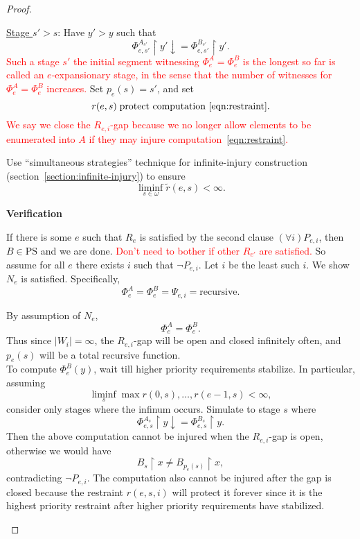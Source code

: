 \documentclass{article}
\newcommand{\COMMENT}[1]{\textcolor{red}{#1}}
\begin{document}
\begin{proof}
\begin{tcolorbox}
      \underline{Stage $s'>s$}: Have $y'>y$ such that
      \begin{equation}
        \Phi_{e,s'}^{A_{s'}}\restriction y' \downarrow=
        \Phi_{e,s'}^{B_{s'}}\restriction y'.
      \end{equation}
      \COMMENT{Such a stage $s'$ the initial segment witnessing
      $\Phi_e^A=\Phi_e^B$ is the longest so far is called an
      $e$-expansionary stage, in the sense that the number of witnesses for
      $\Phi_e^A=\Phi_e^B$ increases.} Set $p_e(s)=s'$, and set
      \begin{equation}
        r(e,s)\; \text{protect computation~\eqref{eqn:restraint}}.
        \label{eqn:r}
      \end{equation}
      \COMMENT{We say we close the $R_{e,i}$-gap because we no longer allow
      elements to be enumerated into $A$ if they may injure
      computation~\eqref{eqn:restraint}.}
    \end{tcolorbox}

    Use ``simultaneous strategies'' technique for infinite-injury
    construction (section~\ref{section:infinite-injury}) to ensure
    \[\liminf_{s\in\omega} \tilde{r}(e,s) <\infty.\]

    \textbf{Verification}
    \begin{tcolorbox}
      If there is some $e$ such that $R_e$ is satisfied by the second
      clause $(\forall i)P_{e,i}$, then $B\in\text{PS}$ and we are done.
      \COMMENT{Don't need to bother if other $R_{e'}$ are satisfied.} So
      assume for all $e$ there exists $i$ such that $\neg P_{e,i}$. Let $i$
      be the least such $i$. We show $N_e$ is satisfied. Specifically,
      \[\Phi^A_e=\Phi^B_e=\Psi_{e,i} =\text{recursive}.\]

      By assumption of $N_e$,
      \[\Phi^A_e=\Phi^B_e.\]
      Thus since $|W_i|=\infty$, the $R_{e,i}$-gap will be open and closed
      infinitely often, and $p_e(s)$ will be a total recursive function.\\

      To compute $\Phi^B_e(y)$, wait till higher priority requirements
      stabilize. In particular, assuming
      \[\liminf_s \max{r(0,s),\ldots,r(e-1,s)} <\infty,\]
      consider only stages where the infinum occurs. Simulate to stage
      $s$ where
      \begin{equation}
        \Phi_{e,s}^{A_s}\restriction y \downarrow=
        \Phi_{e,s}^{B_s}\restriction y.
      \end{equation}
      Then the above computation cannot be injured when the $R_{e,i}$-gap
      is open, otherwise we would have
      \[B_s\restriction x \neq B_{p_e(s)}\restriction x,\]
      contradicting $\neg P_{e,i}$. The computation also cannot be injured
      after the gap is closed because the restraint $r(e,s,i)$ will protect
      it forever since it is the highest priority restraint after higher
      priority requirements have stabilized.
    \end{tcolorbox}



\end{proof}
\end{document}
